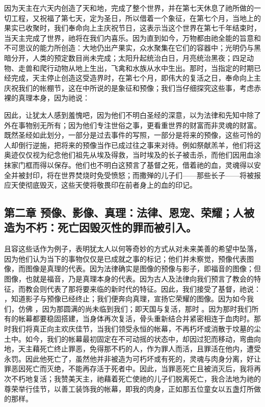 因为天主在六天内创造了天和地，完成了整个世界，并在第七天休息了祂所做的一切工程，又祝福了第七天，定为圣日，所以借着一个象征，在第七个月，当地上的果实已收聚时，我们奉命向上主庆祝节日，这表示当这个世界在第七千年结束时，当天主完成了世界，祂将在我们内喜乐。因为直到如今，万物都由祂全能的旨意和不可思议的能力所创造：大地仍出产果实，众水聚集在它们的容器中；光明仍与黑暗分开，人类的预定数目尚未完成；太阳升起统治白日，月亮统治黑夜；四足动物、走兽和爬行动物从地上生出，飞禽和水族从水中生出。那时，当指定的时期已经完成，天主停止创造这受造界时，在第七个月，即伟大的复活之日，奉命向上主庆祝我们的帐棚节，这在中所说的是象征和预像；我们当仔细探究这些事，考虑赤裸的真理本身，因为祂说： \par

因此，让犹太人感到羞愧吧，因为他们不明白圣经的深意，以为法律和先知中除了外在事物别无所有；因为他们专注世俗之事，更看重世界的财富而非灵魂的财富。既然圣经如此划分，一部分是过去事件的写照，一部分是将来的预像，这些可怜的人却倒行逆施，把将来的预像当作已成过往之事来对待。例如祭献羔羊，他们将这奥迹仅仅视为纪念他们祖先从埃及得救，当时埃及的长子被击杀，而他们因用血涂抹家门框而得以保存。他们也不明白这预言了基督之死，借着祂的血，灵魂得以安全并被封印，将在世界焚烧时免受愤怒；而撒殚的儿子们——那些长子——将被报应天使彻底毁灭，这些天使将敬畏印在前者身上的血的印记。\par


\subsection{第二章  预像、影像、真理：法律、恩宠、荣耀；人被造为不朽：死亡因毁灭性的罪而被引入。}

且容这些话作为例子，表明犹太人以何等奇妙的方式从对未来美善的希望中坠落，因为他们认为当下的事物仅仅是已成就之事的标记；他们并未察觉，预像代表图像，而图像是真理的代表。因为法律确实是图像的预像与影子，即福音的图像；但图像，也就是福音，乃是真理本身的代表。因为古人及法律向我们预言了教会的特征，而教会则代表了那将要来临的新时代的特征。因此，我们接受了基督，祂说： ，知道影子与预像已经终止；我们便奔向真理，宣扬它荣耀的图像。因为如今我们，仿佛 ，因为那圆满的尚未临到我们；即天国与复活，那时 。因为那时我们所有的帐幕都要稳固搭建，当身体再次复活，骨头重新结合并紧密相连于血肉时。那时我们将真正向主欢庆佳节，当我们领受永恒的帐幕，不再朽坏或消散于坟墓的尘土中。如今，我们的帐幕最初固定在不可动摇的状态中，却因过犯而移动，弯曲向地，天主藉死亡终止罪恶，免得那不朽的人，作为罪人而活，且罪活在他内，遭受永罚。因此他死亡了，虽然他并非被造为可朽坏或有死的，灵魂与肉身分离，好让罪恶因死亡而灭绝，不能再存活于死者中。因此，当罪恶死亡且被消灭后，我将再次不朽地复活；我赞美天主，祂藉着死亡使祂的儿子们脱离死亡，我合法地为祂的尊荣举行佳节，以善工装饰我的帐幕，即我的肉身，正如那五位童女以五盏灯所做的那样。\par

